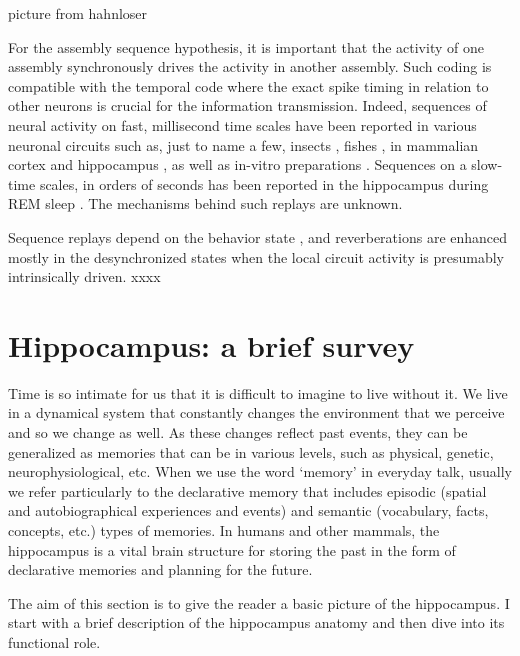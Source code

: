     picture from hahnloser

    For the assembly sequence hypothesis, it is important that the activity of
    one assembly synchronously drives the activity in another assembly. Such
    coding is compatible with the temporal code where the exact spike timing in
    relation to other neurons is crucial for the information transmission.
    Indeed, sequences of neural activity on fast, millisecond time scales have
    been reported in various neuronal circuits such as, just to name a few,
    insects \citep{Fushiki2016}, fishes \citep{Romano2015}, in mammalian cortex
    \citep{Euston2007} and hippocampus \citep{Lee2002}, as well as in-vitro
    preparations \citep{Segev2004, Kruskal2013}. Sequences on a slow-time
    scales, in orders of seconds has been reported in the hippocampus during
    REM sleep \citep{Louie2001}. The mechanisms behind such replays are
    unknown.

    Sequence replays depend on the behavior state \cite{Almenida2014}, and
    reverberations are enhanced mostly in the desynchronized states
    \cite{Contreras2013, Buzsaki1983} when the local circuit activity is
    presumably intrinsically driven. xxxx 
    
\section{Hippocampus: a brief survey}

  Time is so intimate for us that it is difficult to imagine to live without
  it. We live in a dynamical system that constantly changes the environment
  that we perceive and so we change as well. As these changes reflect past
  events, they can be generalized as memories that can be in various levels,
  such as physical, genetic, neurophysiological, etc. When we use the word
  `memory' in everyday talk, usually we refer particularly to the declarative
  memory that includes episodic (spatial and autobiographical experiences and
  events) and semantic (vocabulary, facts, concepts, etc.) types of memories.
  In humans and other mammals, the hippocampus is a vital brain structure for
  storing the past in the form of declarative memories and planning for the
  future.

  The aim of this section is to give the reader a basic picture of the
  hippocampus. I start with a brief description of the hippocampus anatomy and
  then dive into its functional role.


